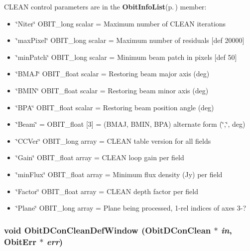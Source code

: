 CLEAN control parameters are in the {\bf Obit\-Info\-List}{\rm (p.\,\pageref{structObitInfoList})} member: \begin{itemize}
\item \char`\"{}Niter\char`\"{} OBIT\_\-long scalar = Maximum number of CLEAN iterations \item \char`\"{}max\-Pixel\char`\"{} OBIT\_\-long scalar = Maximum number of residuals [def 20000] \item \char`\"{}min\-Patch\char`\"{} OBIT\_\-long scalar = Minimum beam patch in pixels [def 50] \item \char`\"{}BMAJ\char`\"{} OBIT\_\-float scalar = Restoring beam major axis (deg) \item \char`\"{}BMIN\char`\"{} OBIT\_\-float scalar = Restoring beam minor axis (deg) \item \char`\"{}BPA\char`\"{} OBIT\_\-float scalar = Restoring beam position angle (deg) \item \char`\"{}Beam\char`\"{} = OBIT\_\-float [3] = (BMAJ, BMIN, BPA) alternate form (\char`\"{},\char`\"{}, deg) \item \char`\"{}CCVer\char`\"{} OBIT\_\-long array = CLEAN table version for all fields \item \char`\"{}Gain\char`\"{} OBIT\_\-float array = CLEAN loop gain per field \item \char`\"{}min\-Flux\char`\"{} OBIT\_\-float array = Minimum flux density (Jy) per field \item \char`\"{}Factor\char`\"{} OBIT\_\-float array = CLEAN depth factor per field \item \char`\"{}Plane\char`\"{} OBIT\_\-long array = Plane being processed, 1-rel indices of axes 3-? 
\end{itemize}
\subsubsection{\setlength{\rightskip}{0pt plus 5cm}void Obit\-DCon\-Clean\-Def\-Window ({\bf Obit\-DCon\-Clean} $\ast$ {\em in}, {\bf Obit\-Err} $\ast$ {\em err})}\label{ObitDConClean_8h_a20}


